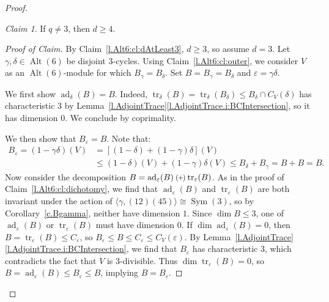 \documentclass[a4paper, 11pt]{amsart}
\theoremstyle{plain}
\theoremstyle{definition}
\theoremstyle{remark}
\newtheorem{claim}{Claim}
\newenvironment{proofclaim}[1][Proof of Claim]{\begin{proof}[#1]\renewcommand{\qedsymbol}{$\lozenge$}}{\end{proof}}
\newcommand{\qoplus}{\mathbin{\scalerel*{\left(\mkern-2mu+\mkern-2mu\right)}{\bigcirc}}}
\DeclareMathOperator{\ad}{ad}
\DeclareMathOperator{\tr}{tr}
\DeclareMathOperator{\Sym}{Sym}
\DeclareMathOperator{\Alt}{Alt}
\begin{document}
\begin{proof}
\begin{claim}\label{l.Alt6:cl:dAtLeast4}
If $q\ne 3$, then $d \ge 4$.  
\end{claim}
\begin{proofclaim}
By Claim~\ref{l.Alt6:cl:dAtLeast3}, $d \ge 3$, so assume $d = 3$. Let $\gamma,\delta \in \Alt(6)$ be disjoint $3$-cycles. Using Claim~\ref{l.Alt6:cl:outer}, we consider $V$ as an $\Alt(6)$-module for which $B_\gamma = B_\delta$. Set $B = B_\gamma = B_\delta$ and  $\varepsilon = \gamma\delta$.

We first show $\ad_\delta(B) = B$. Indeed, $\tr_\delta(B) = \tr_\delta(B_\delta) \leq B_\delta \cap C_V(\delta)$ has characteristic $3$ by Lemma~\ref{l.AdjointTrace}\eqref{l.AdjointTrace.i:BCIntersection}, so it has dimension $0$. We conclude by coprimality.

We then show that $B_\varepsilon = B$. Note that:
\begin{align*}
    B_\varepsilon 
    = (1-\gamma\delta)(V)
    &= [(1-\delta) + (1-\gamma)\delta](V)\\
    &\le (1-\delta)(V) + (1-\gamma)\delta(V)
    \le B_\delta + B_\gamma = B + B = B.
\end{align*} 
Now consider the decomposition $B = \ad_\varepsilon(B) \qoplus \tr_\varepsilon(B)$. As in the proof of Claim~\ref{l.Alt6:cl:dichotomy}, we find that  $\ad_\varepsilon(B)$ and $\tr_\varepsilon(B)$ are both invariant under the action of $\langle \gamma, (12)(45)\rangle \cong \Sym(3)$, so by Corollary~\ref{c.Bgamma}, neither have dimension $1$. Since $\dim B \le 3$, one of $\ad_\varepsilon(B)$ or $\tr_\varepsilon(B)$ must have dimension $0$. If $\dim \ad_\varepsilon(B) = 0$, then $B = \tr_\varepsilon(B) \le C_\varepsilon$, so $B_\varepsilon \le B \le C_\varepsilon \le C_V(\varepsilon)$. By Lemma~\ref{l.AdjointTrace}\eqref{l.AdjointTrace.i:BCIntersection}, we find that $B_\varepsilon$ has characteristic $3$, which contradicts the fact that $V$ is $3$-divisible. Thus $\dim \tr_\varepsilon(B) = 0$, so  
 $B = \ad_\varepsilon(B) \le B_\varepsilon\le B$, implying  $B= B_\varepsilon$.
 

\end{proofclaim}
\end{proof}
\end{document}
